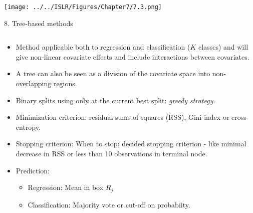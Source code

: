 \documentclass[10pt,ignorenonframetext,]{beamer}
\providecommand{\tightlist}{%
  \setlength{\itemsep}{0pt}\setlength{\parskip}{0pt}}
\begin{document}
\begin{frame}

\texttt{[image: ../../ISLR/Figures/Chapter7/7.3.png]}

\end{frame}

\begin{frame}

\begin{block}{8. Tree-based methods}

\(~\)

\begin{itemize}
\item
  Method applicable both to regression and classification (\(K\)
  classes) and will give non-linear covariate effects and include
  interactions between covariates. \vspace{2mm}
\item
  A tree can also be seen as a division of the covariate space into
  non-overlapping regions. \vspace{2mm}
\item
  Binary splits using only at the current best split: \emph{greedy
  strategy}. \vspace{2mm}
\item
  Minimization criterion: residual sums of squares (RSS), Gini index or
  cross-entropy. \vspace{2mm}
\item
  Stopping criterion: When to stop: decided stopping criterion - like
  minimal decrease in RSS or less than 10 observations in terminal node.
  \vspace{2mm}
\item
  Prediction:

  \begin{itemize}
  \tightlist
  \item
    Regression: Mean in box \(R_j\)
  \item
    Classification: Majority vote or cut-off on probabiity.
  \end{itemize}
\end{itemize}

\end{block}

\end{frame}
\end{document}
